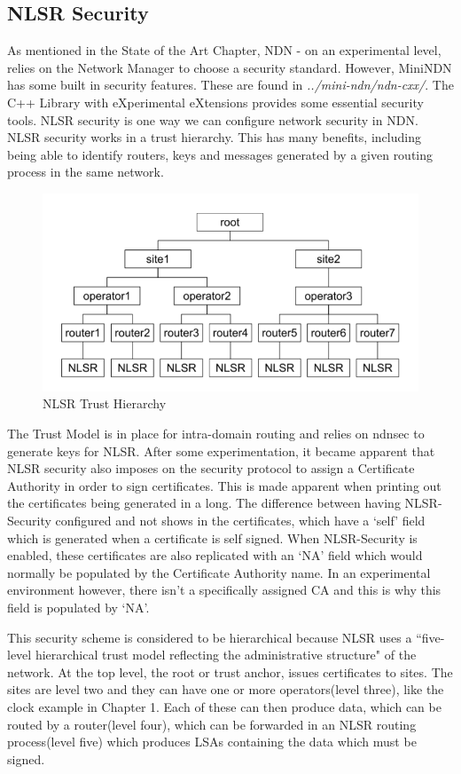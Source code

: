 \subsection{NLSR Security}
As mentioned in the State of the Art Chapter, NDN - on an experimental level, relies on the Network Manager to choose a security standard. However, MiniNDN has some built in security features. These are found in \textit{../mini-ndn/ndn-cxx/}. The C++ Library with eXperimental eXtensions provides some essential security tools. NLSR security is one way we can configure network security in NDN. NLSR security works in a trust hierarchy. This has many benefits, including being able to identify routers, keys and messages generated by a given routing process in the same network.\cite{053}\par
\begin{figure}[ht]
\centering
\includegraphics[scale=0.6]{trusthierarchy.png}
\caption{NLSR Trust Hierarchy\cite{054}}
\end{figure}
\vfill
The Trust Model is in place for intra-domain routing and relies on ndnsec to generate keys for NLSR. After some experimentation, it became apparent that NLSR security also imposes on the security protocol to assign a Certificate Authority in order to sign certificates. This is made apparent when printing out the certificates being generated in a long. The difference between having NLSR-Security configured and not shows in the certificates, which have a `self' field which is generated when a certificate is self signed. When NLSR-Security is enabled, these certificates are also replicated with an `NA' field which would normally be populated by the Certificate Authority name. In an experimental environment however, there isn't a specifically assigned CA and this is why this field is populated by `NA'. \par
This security scheme is considered to be hierarchical because NLSR uses a ``five-level hierarchical trust model reflecting the administrative structure"\cite{055} of the network. At the top level, the root or trust anchor, issues certificates to sites. The sites are level two and they can have one or more operators(level three), like the clock example in Chapter 1. Each of these can then produce data, which can be routed by a router(level four), which can be forwarded in an NLSR routing process(level five) which produces LSAs containing the data which must be signed.
